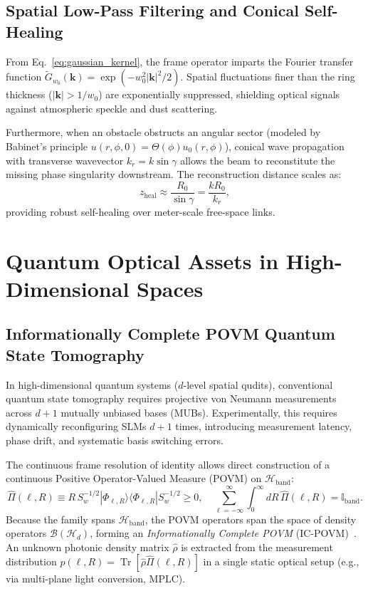 \documentclass{optica-article}
\begin{document}
\subsection{Spatial Low-Pass Filtering and Conical Self-Healing}

From Eq.~\eqref{eq:gaussian_kernel}, the frame operator imparts the Fourier transfer function $\widetilde{G}_{w_0}(\mathbf{k}) = \exp(-w_0^2 |\mathbf{k}|^2 / 2)$. Spatial fluctuations finer than the ring thickness ($|\mathbf{k}| > 1/w_0$) are exponentially suppressed, shielding optical signals against atmospheric speckle and dust scattering.

Furthermore, when an obstacle obstructs an angular sector (modeled by Babinet's principle $u(r, \phi, 0) = \Theta(\phi) u_0(r, \phi)$), conical wave propagation with transverse wavevector $k_r = k \sin \gamma$ allows the beam to reconstitute the missing phase singularity downstream. The reconstruction distance scales as:
\begin{equation}
z_{\text{heal}} \approx \frac{R_0}{\sin \gamma} = \frac{k R_0}{k_r},
\label{eq:self_healing_distance}
\end{equation}
providing robust self-healing over meter-scale free-space links.

\section{Quantum Optical Assets in High-Dimensional Spaces}
\label{sec:quantum_assets}

\subsection{Informationally Complete POVM Quantum State Tomography}

In high-dimensional quantum systems ($d$-level spatial qudits), conventional quantum state tomography requires projective von Neumann measurements across $d+1$ mutually unbiased bases (MUBs). Experimentally, this requires dynamically reconfiguring SLMs $d+1$ times, introducing measurement latency, phase drift, and systematic basis switching errors.

The continuous frame resolution of identity allows direct construction of a continuous Positive Operator-Valued Measure (POVM) on $\mathcal{H}_{\text{band}}$:
\begin{equation}
\boxed{\hat{\Pi}(\ell, R) \equiv R \, S_w^{-1/2} |\Phi_{\ell, R}\rangle \langle \Phi_{\ell, R}| S_w^{-1/2} \ge 0, \quad \sum_{\ell=-\infty}^\infty \int_0^\infty dR \, \hat{\Pi}(\ell, R) = \mathbb{I}_{\text{band}}.}
\label{eq:povm_def}
\end{equation}
Because the family spans $\mathcal{H}_{\text{band}}$, the POVM operators span the space of density operators $\mathcal{B}(\mathcal{H}_d)$, forming an \emph{Informationally Complete POVM} (IC-POVM)~\cite{Renes2004,BraunsteinCaves1994}. An unknown photonic density matrix $\hat{\rho}$ is extracted from the measurement distribution $p(\ell, R) = \operatorname{Tr}[\hat{\rho} \hat{\Pi}(\ell, R)]$ in a single static optical setup (e.g., via multi-plane light conversion, MPLC).
\end{document}

